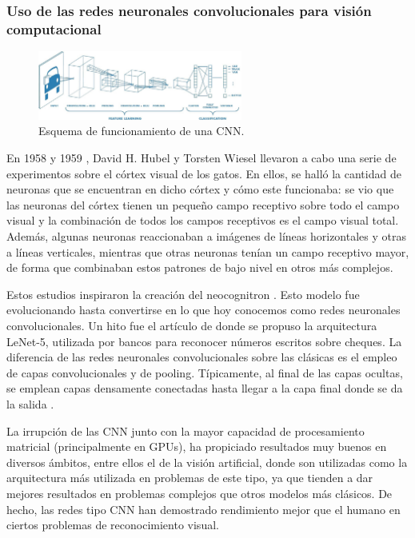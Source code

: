 \subsubsection*{Uso de las redes neuronales convolucionales para visión computacional}

\begin{figure}[H]
  \centering
  \includegraphics[width=0.6\textwidth]{images/cnn}
  \caption{Esquema de funcionamiento de una CNN.}
  \label{fig:cnn}
\end{figure}

En 1958 \cite{art:cat58} y 1959 \cite{art:cat59}, David H. Hubel y Torsten Wiesel llevaron a cabo una serie de experimentos sobre el córtex visual de los gatos. En ellos, se halló la cantidad de neuronas que se encuentran en dicho córtex y cómo este funcionaba: se vio que las neuronas del córtex tienen un pequeño campo receptivo sobre todo el campo visual y la combinación de todos los campos receptivos es el campo visual total. Además, algunas neuronas reaccionaban a imágenes de líneas horizontales y otras a líneas verticales, mientras que otras neuronas tenían un campo receptivo mayor, de forma que combinaban estos patrones de bajo nivel en otros más complejos.

Estos estudios inspiraron la creación del neocognitron \cite{art:neocognitron}. Esto modelo fue evolucionando hasta convertirse en lo que hoy conocemos como redes neuronales convolucionales. Un hito fue el artículo de \citet{lecun1998gradient} donde se propuso la arquitectura LeNet-5, utilizada por bancos para reconocer números escritos sobre cheques. La diferencia de las redes neuronales convolucionales sobre las clásicas es el empleo de capas convolucionales y de pooling. Típicamente, al final de las capas ocultas, se emplean capas densamente conectadas hasta llegar a la capa final donde se da la salida \cite{book:homl}.

La irrupción de las CNN junto con la mayor capacidad de procesamiento matricial (principalmente en GPUs), ha propiciado resultados muy buenos en diversos ámbitos, entre ellos el de la visión artificial, donde son utilizadas como la arquitectura más utilizada en problemas de este tipo, ya que tienden a dar mejores resultados en problemas complejos que otros modelos más clásicos. De hecho, las redes tipo CNN han demostrado rendimiento mejor que el humano en ciertos problemas de reconocimiento visual.

